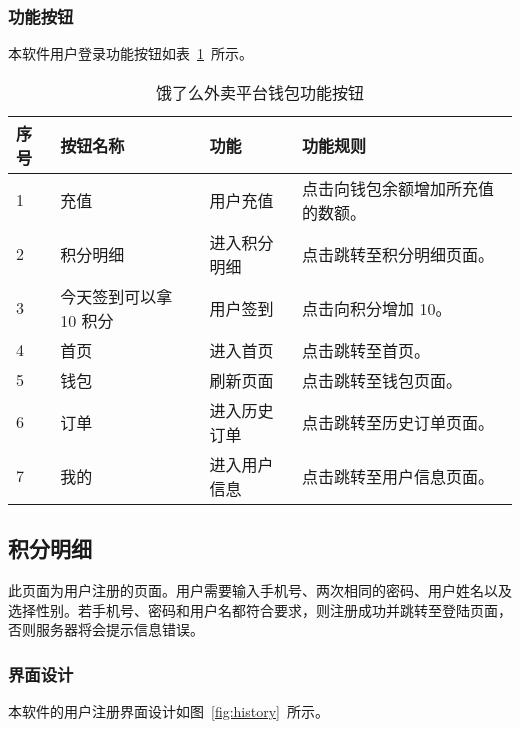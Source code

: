 \subsubsection{功能按钮}
本软件用户登录功能按钮如表~\ref{tab:table8}~所示。
\begin{table}[htbp]
    \caption{饿了么外卖平台钱包功能按钮}\label{tab:table8}
    \vspace{0.5em}\wuhao
    \begin{tabularx}{\textwidth}{lllX}
    \toprule[1.5pt]
    序号 & 按钮名称 & 功能 & 功能规则 \\ 
    \midrule[1pt]
    1 & 充值 & 用户充值 & 点击向钱包余额增加所充值的数额。 \\
    2 & 积分明细 & 进入积分明细 & 点击跳转至积分明细页面。 \\
    3 & 今天签到可以拿 10 积分 & 用户签到 & 点击向积分增加 10。 \\
    4 & 首页 & 进入首页 & 点击跳转至首页。 \\
    5 & 钱包 & 刷新页面 & 点击跳转至钱包页面。 \\
    6 & 订单 & 进入历史订单 & 点击跳转至历史订单页面。 \\
    7 & 我的 & 进入用户信息 & 点击跳转至用户信息页面。 \\
\bottomrule[1.5pt]
\end{tabularx}
\vspace{\baselineskip}
\end{table}

\subsection{积分明细}
此页面为用户注册的页面。用户需要输入手机号、两次相同的密码、用户姓名以及选择性别。若手机号、密码和用户名都符合要求，则注册成功并跳转至登陆页面，否则服务器将会提示信息错误。
\subsubsection{界面设计}
本软件的用户注册界面设计如图~\ref{fig:history}~所示。
